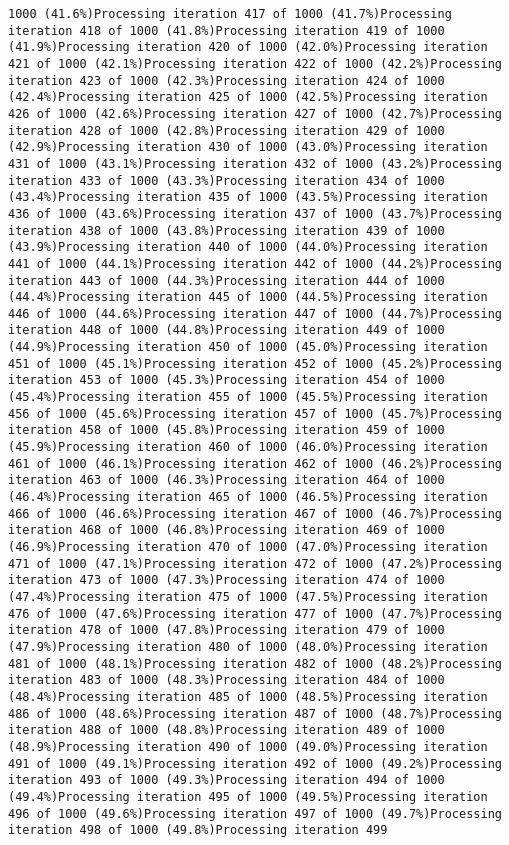 \documentclass[
]{article}
\begin{document}
\begin{verbatim}
1000 (41.6%)Processing iteration 417 of 1000 (41.7%)Processing iteration 418 of 1000 (41.8%)Processing iteration 419 of 1000 (41.9%)Processing iteration 420 of 1000 (42.0%)Processing iteration 421 of 1000 (42.1%)Processing iteration 422 of 1000 (42.2%)Processing iteration 423 of 1000 (42.3%)Processing iteration 424 of 1000 (42.4%)Processing iteration 425 of 1000 (42.5%)Processing iteration 426 of 1000 (42.6%)Processing iteration 427 of 1000 (42.7%)Processing iteration 428 of 1000 (42.8%)Processing iteration 429 of 1000 (42.9%)Processing iteration 430 of 1000 (43.0%)Processing iteration 431 of 1000 (43.1%)Processing iteration 432 of 1000 (43.2%)Processing iteration 433 of 1000 (43.3%)Processing iteration 434 of 1000 (43.4%)Processing iteration 435 of 1000 (43.5%)Processing iteration 436 of 1000 (43.6%)Processing iteration 437 of 1000 (43.7%)Processing iteration 438 of 1000 (43.8%)Processing iteration 439 of 1000 (43.9%)Processing iteration 440 of 1000 (44.0%)Processing iteration 441 of 1000 (44.1%)Processing iteration 442 of 1000 (44.2%)Processing iteration 443 of 1000 (44.3%)Processing iteration 444 of 1000 (44.4%)Processing iteration 445 of 1000 (44.5%)Processing iteration 446 of 1000 (44.6%)Processing iteration 447 of 1000 (44.7%)Processing iteration 448 of 1000 (44.8%)Processing iteration 449 of 1000 (44.9%)Processing iteration 450 of 1000 (45.0%)Processing iteration 451 of 1000 (45.1%)Processing iteration 452 of 1000 (45.2%)Processing iteration 453 of 1000 (45.3%)Processing iteration 454 of 1000 (45.4%)Processing iteration 455 of 1000 (45.5%)Processing iteration 456 of 1000 (45.6%)Processing iteration 457 of 1000 (45.7%)Processing iteration 458 of 1000 (45.8%)Processing iteration 459 of 1000 (45.9%)Processing iteration 460 of 1000 (46.0%)Processing iteration 461 of 1000 (46.1%)Processing iteration 462 of 1000 (46.2%)Processing iteration 463 of 1000 (46.3%)Processing iteration 464 of 1000 (46.4%)Processing iteration 465 of 1000 (46.5%)Processing iteration 466 of 1000 (46.6%)Processing iteration 467 of 1000 (46.7%)Processing iteration 468 of 1000 (46.8%)Processing iteration 469 of 1000 (46.9%)Processing iteration 470 of 1000 (47.0%)Processing iteration 471 of 1000 (47.1%)Processing iteration 472 of 1000 (47.2%)Processing iteration 473 of 1000 (47.3%)Processing iteration 474 of 1000 (47.4%)Processing iteration 475 of 1000 (47.5%)Processing iteration 476 of 1000 (47.6%)Processing iteration 477 of 1000 (47.7%)Processing iteration 478 of 1000 (47.8%)Processing iteration 479 of 1000 (47.9%)Processing iteration 480 of 1000 (48.0%)Processing iteration 481 of 1000 (48.1%)Processing iteration 482 of 1000 (48.2%)Processing iteration 483 of 1000 (48.3%)Processing iteration 484 of 1000 (48.4%)Processing iteration 485 of 1000 (48.5%)Processing iteration 486 of 1000 (48.6%)Processing iteration 487 of 1000 (48.7%)Processing iteration 488 of 1000 (48.8%)Processing iteration 489 of 1000 (48.9%)Processing iteration 490 of 1000 (49.0%)Processing iteration 491 of 1000 (49.1%)Processing iteration 492 of 1000 (49.2%)Processing iteration 493 of 1000 (49.3%)Processing iteration 494 of 1000 (49.4%)Processing iteration 495 of 1000 (49.5%)Processing iteration 496 of 1000 (49.6%)Processing iteration 497 of 1000 (49.7%)Processing iteration 498 of 1000 (49.8%)Processing iteration 499 
\end{verbatim}
\end{document}
